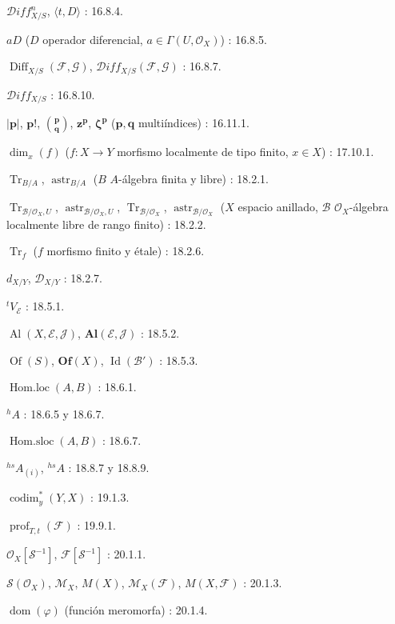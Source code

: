 $\mathcal{D}iff^{n}_{X/S}$, $\langle t,D\rangle$ : 16.8.4.

$aD$ ($D$ operador diferencial, $a\in\Gamma(U,\mathcal{O}_X)$) : 16.8.5.

$\operatorname{Diff}_{X/S}(\mathcal{F},\mathcal{G})$,
$\mathcal{D}iff_{X/S}(\mathcal{F},\mathcal{G})$ : 16.8.7.

$\mathcal{D}iff_{X/S}$ : 16.8.10.

$|\mathbf p|$, $\mathbf p!$, $\binom{\mathbf p}{\mathbf q}$,
$\mathbf z^{\mathbf p}$, $\boldsymbol\zeta^{\mathbf p}$
($\mathbf p,\mathbf q$ multiíndices) : 16.11.1.

$\dim_x(f)$ ($f:X\to Y$ morfismo localmente de tipo finito, $x\in X$) : 17.10.1.

$\operatorname{Tr}_{B/A}$, $\operatorname{astr}_{B/A}$
($B$ $A$-álgebra finita y libre) : 18.2.1.

$\operatorname{Tr}_{\mathcal B/\mathcal O_X,U}$,
$\operatorname{astr}_{\mathcal B/\mathcal O_X,U}$,
$\operatorname{Tr}_{\mathcal B/\mathcal O_X}$,
$\operatorname{astr}_{\mathcal B/\mathcal O_X}$
($X$ espacio anillado, $\mathcal B$ $\mathcal O_X$-álgebra localmente libre de rango finito) : 18.2.2.

$\operatorname{Tr}_f$ ($f$ morfismo finito y étale) : 18.2.6.

$d_{X/Y}$, $\mathcal D_{X/Y}$ : 18.2.7.

${}^{t}V_{\mathcal E}$ : 18.5.1.

$\operatorname{Al}(X,\mathcal E,\mathcal J)$, $\mathbf{Al}(\mathcal E,\mathcal J)$ : 18.5.2.

$\operatorname{Of}(S)$, $\mathbf{Of}(X)$, $\operatorname{Id}(\mathcal B')$ : 18.5.3.

$\operatorname{Hom.loc}(A,B)$ : 18.6.1.

${}^{h}A$ : 18.6.5 y 18.6.7.

$\operatorname{Hom.sloc}(A,B)$ : 18.6.7.

${}^{hs}A_{(i)}$, ${}^{hs}A$ : 18.8.7 y 18.8.9.

$\operatorname{codim}^{*}_{y}(Y,X)$ : 19.1.3.

$\operatorname{prof}_{T,t}(\mathcal F)$ : 19.9.1.

$\mathcal O_X[\mathcal S^{-1}]$, $\mathcal F[\mathcal S^{-1}]$ : 20.1.1.

$\mathcal S(\mathcal O_X)$, $\mathcal M_X$, $M(X)$,
$\mathcal M_X(\mathcal F)$, $M(X,\mathcal F)$ : 20.1.3.

$\operatorname{dom}(\varphi)$ (función meromorfa) : 20.1.4.

